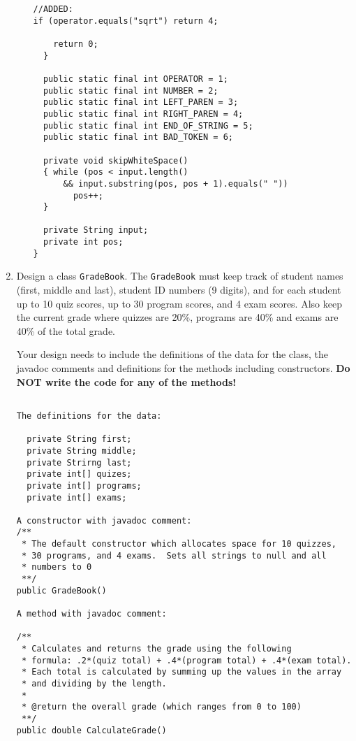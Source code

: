 \begin{enumerate}
\begin{enumerate}
\begin{verbatim}
//ADDED:
if (operator.equals("sqrt") return 4;
    
    return 0; 
  }

  public static final int OPERATOR = 1;
  public static final int NUMBER = 2;
  public static final int LEFT_PAREN = 3;
  public static final int RIGHT_PAREN = 4;
  public static final int END_OF_STRING = 5;
  public static final int BAD_TOKEN = 6;

  private void skipWhiteSpace()
  { while (pos < input.length() 
      && input.substring(pos, pos + 1).equals(" "))
        pos++;
  }

  private String input;
  private int pos;
}
\end{verbatim}
                \end{enumerate}
            

        \item  Design a class {\tt GradeBook}.  The {\tt GradeBook} must 
		keep track of student names (first, middle and last),
		student ID numbers (9 digits), and for each student
		up to 10 quiz scores, up to 30 program scores, and
		4 exam scores.	Also keep the current grade where
		quizzes are 20\%, programs are 40\% and exams are
		40\% of the total grade.

		Your design needs to include the definitions of
		the data for the class, the javadoc comments and
		definitions for the methods including constructors.
		{\bf Do NOT write the code for any of the methods!}
		
\begin{verbatim}

The definitions for the data:

  private String first;
  private String middle;
  private Strirng last;
  private int[] quizes;
  private int[] programs;
  private int[] exams;

A constructor with javadoc comment:
/**
 * The default constructor which allocates space for 10 quizzes,
 * 30 programs, and 4 exams.  Sets all strings to null and all 
 * numbers to 0
 **/
public GradeBook()

A method with javadoc comment:

/**
 * Calculates and returns the grade using the following 
 * formula: .2*(quiz total) + .4*(program total) + .4*(exam total).
 * Each total is calculated by summing up the values in the array
 * and dividing by the length. 
 *
 * @return the overall grade (which ranges from 0 to 100)
 **/
public double CalculateGrade()


\end{verbatim}

\end{enumerate}


